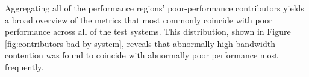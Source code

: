 Aggregating all of the performance regions' poor-performance contributors yields a broad overview of the metrics that most commonly coincide with poor performance across all of the test systems.
This distribution, shown in Figure \ref{fig:contributors-bad-by-system}, reveals that abnormally high bandwidth contention was found to coincide with abnormally poor performance most frequently.



